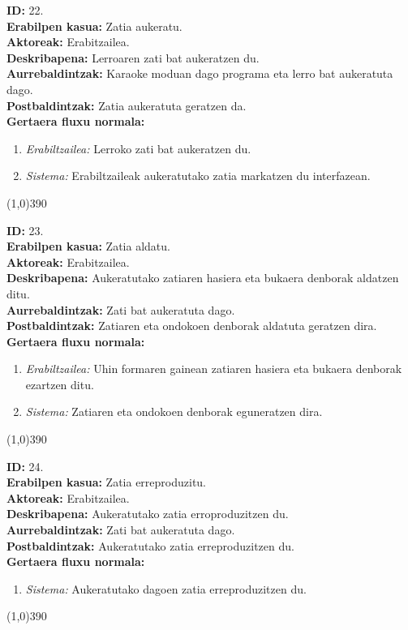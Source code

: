 \noindent
\textbf{ID:} 22.\\
\textbf{Erabilpen kasua:} Zatia aukeratu.\\
\textbf{Aktoreak:} Erabitzailea.\\
\textbf{Deskribapena:} Lerroaren zati bat aukeratzen du.\\
\textbf{Aurrebaldintzak:} Karaoke moduan dago programa eta lerro bat aukeratuta dago.\\
\textbf{Postbaldintzak:} Zatia aukeratuta geratzen da.\\
\textbf{Gertaera fluxu normala:}
\begin{enumerate}
	\item \textit{Erabiltzailea:} Lerroko zati bat aukeratzen du.
	\item \textit{Sistema:} Erabiltzaileak aukeratutako zatia markatzen du interfazean.
\end{enumerate}
\line(1,0){390}

\noindent
\textbf{ID:} 23.\\
\textbf{Erabilpen kasua:} Zatia aldatu.\\
\textbf{Aktoreak:} Erabitzailea.\\
\textbf{Deskribapena:} Aukeratutako zatiaren hasiera eta bukaera denborak aldatzen ditu.\\
\textbf{Aurrebaldintzak:} Zati bat aukeratuta dago.\\
\textbf{Postbaldintzak:} Zatiaren eta ondokoen denborak aldatuta geratzen dira.\\
\textbf{Gertaera fluxu normala:}
\begin{enumerate}
	\item \textit{Erabiltzailea:} Uhin formaren gainean zatiaren hasiera eta bukaera denborak ezartzen ditu.
	\item \textit{Sistema:} Zatiaren eta ondokoen denborak eguneratzen dira.
\end{enumerate}
\line(1,0){390}

\noindent
\textbf{ID:} 24.\\
\textbf{Erabilpen kasua:} Zatia erreproduzitu.\\
\textbf{Aktoreak:} Erabitzailea.\\
\textbf{Deskribapena:} Aukeratutako zatia erroproduzitzen du.\\
\textbf{Aurrebaldintzak:} Zati bat aukeratuta dago.\\
\textbf{Postbaldintzak:} Aukeratutako zatia erreproduzitzen du.\\
\textbf{Gertaera fluxu normala:}
\begin{enumerate}
	\item \textit{Sistema:} Aukeratutako dagoen zatia erreproduzitzen du.
\end{enumerate}
\line(1,0){390}

